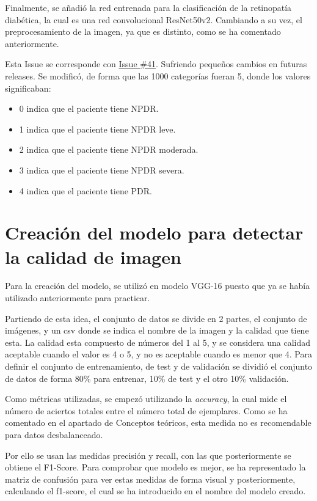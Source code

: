 Finalmente, se añadió la red entrenada para la clasificación de la retinopatía diabética, la cual es una red convolucional ResNet50v2. Cambiando a su vez, el preprocesamiento de la imagen, ya que es distinto, como se ha comentado anteriormente.

Esta Issue se corresponde con \href{https://github.com/mfg1014/Retinopatia-diabetica/issues/41}{Issue \#41}. Sufriendo pequeños cambios en futuras releases. Se modificó, de forma que las 1000 categorías fueran 5, donde los valores significaban:

\begin{itemize}
    \item 0 indica que el paciente tiene NPDR.
    \item 1 indica que el paciente tiene NPDR leve.
    \item 2 indica que el paciente tiene NPDR moderada.
    \item 3 indica que el paciente tiene NPDR severa.
    \item 4 indica que el paciente tiene PDR.
\end{itemize}

\section{Creación del modelo para detectar la calidad de imagen}

Para la creación del modelo, se utilizó en modelo VGG-16 puesto que ya se había utilizado anteriormente para practicar.

Partiendo de esta idea, el conjunto de datos se divide en 2 partes, el conjunto de imágenes, y un csv donde se indica el nombre de la imagen y la calidad que tiene esta.
La calidad esta compuesto de números del 1 al 5, y se considera una calidad aceptable cuando el valor es 4 o 5, y no es aceptable cuando es menor que 4. 
Para definir el conjunto de entrenamiento, de test y de validación se dividió el conjunto de datos de forma 80\% para entrenar, 10\% de test y el otro 10\% validación.

Como métricas utilizadas, se empezó utilizando la \textit{accuracy}, la cual mide el número de aciertos totales entre el número total de ejemplares. Como se ha comentado en el apartado de Conceptos teóricos, esta medida no es recomendable para datos desbalanceado.

Por ello se usan las medidas precisión y recall, con las que posteriormente se obtiene el F1-Score. Para comprobar que modelo es mejor, se ha representado la matriz de confusión para ver estas medidas de forma visual y posteriormente, calculando el f1-score, el cual se ha introducido en el nombre del modelo creado.

